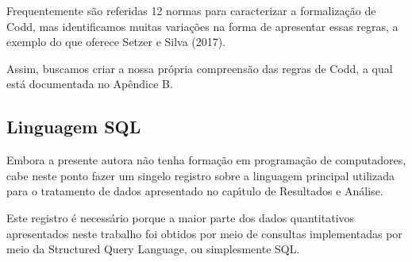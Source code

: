 \documentclass[
12pt,		%
openright,	%
twoside,  %
a4paper,			%
chapter=TITLE,		%
english,			%
french,				%
spanish,			%
brazil				%
]{USPSC-classe/USPSC}
\begin{document}
Frequentemente s\~ao referidas 12 normas para caracterizar a formaliza\c{c}\~ao de Codd, mas identificamos muitas varia\c{c}\~oes na forma de apresentar essas regras, a exemplo do que oferece Setzer e Silva (2017).

















Assim, buscamos criar a nossa pr\'opria compreens\~ao das regras de Codd, a qual est\'a documentada no Ap\^endice B.

















\subsection[Linguagem SQL]{Linguagem SQL}\label{Linguagem SQL}
Embora a presente autora n\~ao tenha forma\c{c}\~ao em programa\c{c}\~ao de computadores, cabe neste ponto fazer um singelo registro sobre a linguagem principal utilizada para o tratamento de dados apresentado no cap\'{\i}tulo de \textquotedbl Resultados e An\'alise\textquotedbl .

















Este registro \'e necess\'ario porque a maior parte dos dados quantitativos apresentados neste trabalho foi obtidos por meio de consultas implementadas por meio da Structured Query Language, ou simplesmente SQL.
\end{document}
